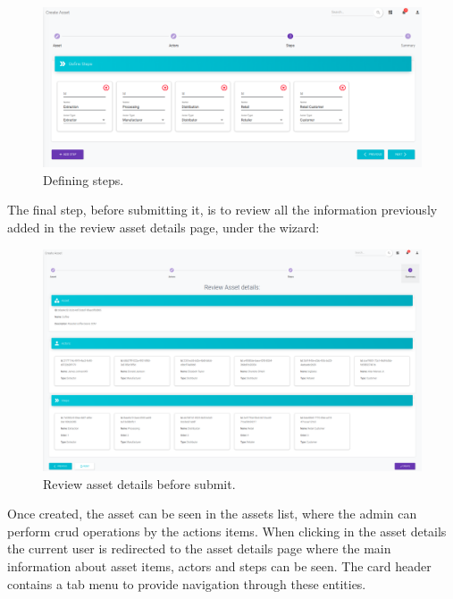 \begin{figure}[H]
\begin{center}
  \includegraphics[scale=0.27]{images/use_example/03_create_asset_3.png}
\caption{Defining steps.}
\label{fig:create_asset_3}
\end{center}
\end{figure}

The final step, before submitting it, is to review all the information previously added in the review asset details page, under the wizard:
\begin{figure}[H]
\begin{center}
  \includegraphics[scale=0.265]{images/use_example/04_create_asset_4.png}
\caption{Review asset details before submit.}
\label{fig:create_asset_4}
\end{center}
\end{figure}


Once created, the asset can be seen in the assets list, where the admin can perform crud operations by the actions items. When clicking in the asset details the current user is redirected to the asset details page where the main information about asset items, actors and steps can be seen. The card header contains a tab menu to provide navigation through these entities. 



